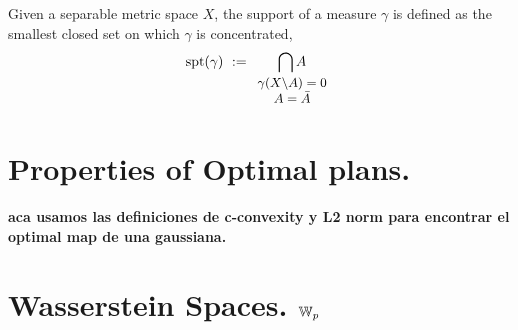 \begin{definition}
	Given a separable metric space $X$, the support of a measure $\gamma$ is defined as the smallest closed set on which $\gamma$ is concentrated,
	\begin{equation}
	\spt(\gamma)\ :=\underset{\small{\begin{array}{c}
			\gamma(X\backslash A)=0\\ A=\bar{A}  \end{array}}}{\bigcap A} 		
	\end{equation} 
\end{definition}


\section{Properties of Optimal plans.}

\begin{theorem}

\end{theorem}
\textbf{aca usamos las definiciones de c-convexity y L2 norm para encontrar el optimal map de una gaussiana.}


\section{Wasserstein Spaces. $\mathbb{W}_{p}$}

